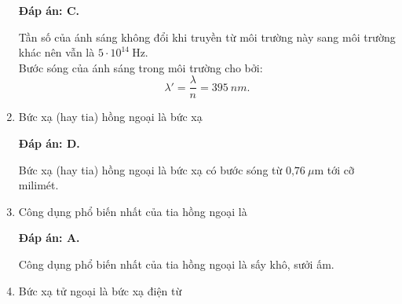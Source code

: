 \begin{enumerate}[label=\bfseries Câu \arabic*:]
	\loigiai
	{		\textbf{Đáp án: C.}
		
Tần số của ánh sáng không đổi khi truyền từ môi trường này sang môi trường khác nên vẫn là $ 5\cdot 10^{14}\ \text{Hz} $. \\
Bước sóng của ánh sáng trong môi trường cho bởi:
$$
	\lambda' = \dfrac{\lambda}{n} = \SI{395}{nm}.
$$
		
	}
	
	\item {} 
	
	\cauhoi
	{Bức xạ (hay tia) hồng ngoại là bức xạ
	}
	
	\loigiai
	{		\textbf{Đáp án: D.}
		
Bức xạ (hay tia) hồng ngoại là bức xạ có bước sóng từ $\text{0,76}\ \mu\text{m}$ tới cỡ milimét. 
		
	}
	
	\item {}
	
	\cauhoi
	{Công dụng phổ biến nhất của tia hồng ngoại là
	}
	
	\loigiai
	{		\textbf{Đáp án: A.}
		
Công dụng phổ biến nhất của tia hồng ngoại là sấy khô, sưởi ấm. 
		
	}
	
	\item {} 
	
	\cauhoi
	{Bức xạ tử ngoại là bức xạ điện từ
	}
	

\end{enumerate}
